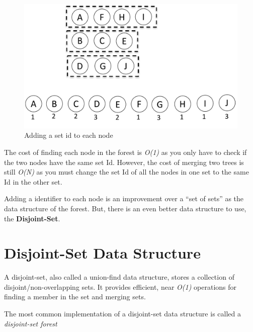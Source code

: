 \documentclass[
]{book}
\begin{document}
\begin{figure}

{\centering \includegraphics{img/07-image02} 

}

\caption{Adding a set id to each node}\label{fig:set-id}
\end{figure}

The {cost of finding} each node in the forest is \emph{O(1)} as you only have to check if the two nodes have the same set Id. However, the {cost of merging} two trees is still \emph{O(N)} as you must change the set Id of all the nodes in one set to the same Id in the other set.

Adding a identifier to each node is an improvement over a ``set of sets'' as the data structure of the forest. But, there is an even better data structure to use, the \textbf{Disjoint-Set}.

\hypertarget{disjoint-set-data-structure}{%
\section{Disjoint-Set Data Structure}\label{disjoint-set-data-structure}}

A {disjoint-set}, also called a {union-find} data structure, stores a collection of disjoint/non-overlapping sets. It provides efficient, near \emph{O(1)} operations for finding a member in the set and merging sets.

The most common implementation of a disjoint-set data structure is called a \emph{disjoint-set forest}
\end{document}
